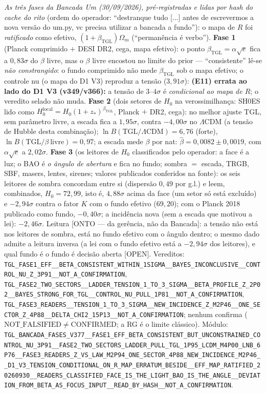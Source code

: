 \documentclass[11pt]{article}
\newcommand{\bTGL}{\beta_{\mathrm{TGL}}}\newcommand{\Msun}{M_{\odot}}\newcommand{\TGL}{\mathrm{TGL}}
\theoremstyle{definition}\newtheorem{deriv}{Derivação}
\begin{document}
\emph{As três fases da Bancada Um (30/09/2026), pré-registradas e lidas por hash do cache do rito} (ordem do operador: ``destranque tudo [...] antes de escrevermos a nova versão do um.py, vc precisa utilizar a bancada a fundo''): o mapa de $R$ foi \emph{ratificado} como efetivo, $(1+\bTGL)\Omega_m$ (``permanência é verbo''). \textbf{Fase 1} (Planck comprimido $+$ DESI DR2, cega, mapa efetivo): o ponto $\bTGL=\alpha\sqrt e$ fica a $0{,}83\sigma$ do $\beta$ livre, mas o $\beta$ livre encostou no limite do prior --- ``consistente'' lê-se \emph{não constrangido}: o fundo comprimido não mede $\bTGL$ sob o mapa efetivo; o controle nu (o mapa do D1 V3) reproduz a tensão ($3{,}91\sigma$): \textbf{(E11) errata ao lado do D1 V3 (v349/v366):} a tensão de $3$--$4\sigma$ é \emph{condicional ao mapa de $R$}; o veredito selado não muda. \textbf{Fase 2} (dois setores de $H_0$ na verossimilhança: SH0ES lido como $H_0^{\mathrm{local}}=H_0(1+z_*)^{\bTGL}$, Planck $+$ DR2, cega): no melhor ajuste TGL, sem parâmetro livre, a escada fica a $1{,}95\sigma$, contra $-4{,}00\sigma$ no $\Lambda$CDM (a tensão de Hubble desta combinação); $\ln B(\mathrm{TGL}/\Lambda\mathrm{CDM})=6{,}76$ (forte), $\ln B(\mathrm{TGL}/\beta\ \mathrm{livre})=0{,}97$; a escada mede $\beta$ por nat: $\hat\beta=0{,}0082\pm0{,}0019$, com $\alpha\sqrt e$ a $2{,}02\sigma$. \textbf{Fase 3} (os leitores de $H_0$ classificados pelo operador: a face é a luz; o BAO é \emph{o ângulo de abertura} e fica no fundo; sombra $=$ escada, TRGB, SBF, masers, lentes, sirenes; valores publicados conferidos na fonte): os seis leitores de sombra concordam entre si (dispersão $0{,}49$ por g.l.) e leem, combinados, $H_0=72{,}99$, isto é, $4{,}88\sigma$ acima da face (um setor só está excluído) e $-2{,}94\sigma$ contra o fator $K$ com o fundo efetivo ($69{,}20$); com o Planck 2018 publicado como fundo, $-0{,}40\sigma$; a incidência nova (sem a escada que motivou a lei): $-2{,}46\sigma$. Leitura \textsf{[ONTO --- da gerência, não da Bancada]}: a tensão não está nos leitores de sombra, está no fundo efetivo com o ângulo dentro; o mesmo dado admite a leitura inversa (a lei com o fundo efetivo está a $-2{,}94\sigma$ dos leitores), e qual fundo é o fundo é decisão aberta \textsf{[OPEN]}. Vereditos: \texttt{TGL\_FASE1\_EFF\_\_BETA\_CONSISTENT\_WITHIN\_1SIGMA\_\_BAYES\_INCONCLUSIVE\_\_CONTROL\_NU\_Z\_3P91\_\_NOT\_A\_CONFIRMATION}, \texttt{TGL\_FASE2\_TWO\_SECTORS\_\_LADDER\_TENSION\_1\_TO\_3\_SIGMA\_\_BETA\_PROFILE\_Z\_2P02\_\_BAYES\_STRONG\_FOR\_TGL\_\_CONTROL\_NU\_PULL\_1P81\_\_NOT\_A\_CONFIRMATION}, \texttt{TGL\_FASE3\_READERS\_\_TENSION\_1\_TO\_3\_SIGMA\_\_NEW\_INCIDENCE\_Z\_M2P46\_\_ONE\_SECTOR\_Z\_4P88\_\_DELTA\_CHI2\_15P13\_\_NOT\_A\_CONFIRMATION}; nenhum confirma ($\mathrm{NOT\_FALSIFIED}\neq\mathrm{CONFIRMED}$; a RG é o limite clássico). Módulo: \texttt{TGL\_BANCADA\_FASES\_V377\_\_FASE1\_EFF\_BETA\_CONSISTENT\_BUT\_UNCONSTRAINED\_CONTROL\_NU\_3P91\_\_FASE2\_TWO\_SECTORS\_LADDER\_PULL\_TGL\_1P95\_LCDM\_M4P00\_LNB\_6P76\_\_FASE3\_READERS\_Z\_VS\_LAW\_M2P94\_ONE\_SECTOR\_4P88\_NEW\_INCIDENCE\_M2P46\_\_D1\_V3\_TENSION\_CONDITIONAL\_ON\_R\_MAP\_ERRATUM\_BESIDE\_\_EFF\_MAP\_RATIFIED\_20260930\_\_READERS\_CLASSIFIED\_FACE\_IS\_THE\_LIGHT\_BAO\_IS\_THE\_ANGLE\_\_DEVIATION\_FROM\_BETA\_AS\_FOCUS\_INPUT\_\_READ\_BY\_HASH\_\_NOT\_A\_CONFIRMATION}.
\end{document}

